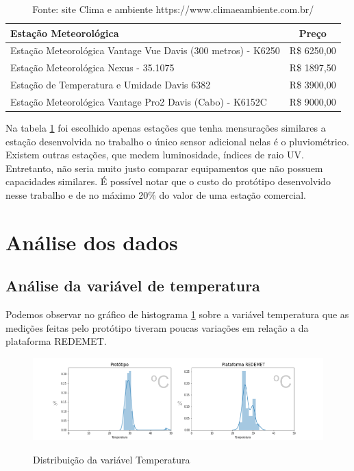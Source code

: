 \begin{table}[!h]
\centering
\begin{tabular}{|l|c|}
\hline
\textbf{Estação Meteorológica}                               & \textbf{Preço} \\ \hline
Estação Meteorológica Vantage Vue Davis (300 metros) - K6250 & R\$ 6250,00    \\ \hline
Estação Meteorológica Nexus - 35.1075                        & R\$ 1897,50    \\ \hline
Estação de Temperatura e Umidade Davis 6382         & R\$ 3900,00   \\ \hline
Estação Meteorológica Vantage Pro2 Davis (Cabo) - K6152C     & R\$ 9000,00    \\ \hline
\end{tabular}
\caption{Fonte: site Clima e ambiente https://www.climaeambiente.com.br/}
\label{tab:custos_estacoes}
\end{table}

Na tabela \ref{tab:custos_estacoes} foi escolhido apenas estações que tenha mensurações similares a estação desenvolvida no trabalho o único sensor adicional nelas é o pluviométrico. Existem outras estações, que medem luminosidade, índices de raio UV. Entretanto, não seria muito justo comparar equipamentos que não possuem capacidades similares. É possível notar que o custo do protótipo desenvolvido nesse trabalho e de no máximo 20\% do valor de uma estação comercial.
 

\section{Análise dos dados}


\subsection{Análise da variável de temperatura}

Podemos observar no gráfico de histograma \ref{fig:dist_temperatura} sobre a variável temperatura que as medições feitas pelo protótipo tiveram poucas variações em relação a da plataforma REDEMET. 

\begin{figure} [!h]
    \centering
    \caption{Distribuição da variável Temperatura}    
    \includegraphics [scale = 0.5] {Figuras/dist_temp.png}
    \label{fig:dist_temperatura}
\end{figure}

